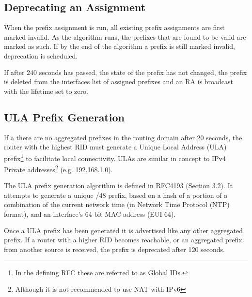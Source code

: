 \documentclass[12pt,a4paper,twoside]{report}
\begin{document}
\subsection{Deprecating an Assignment}
When the prefix assignment is run, all existing prefix assignments are first
marked invalid. As the algorithm runs, the prefixes that are found to be valid
are marked as such. If by the end of the algorithm a prefix is still marked
invalid, deprecation is scheduled. 

If after 240 seconds has passed, the state of the prefix has not changed, the
prefix is deleted from the interfaces list of assigned prefixes and an RA is
broadcast with the lifetime set to zero. 

\subsection{ULA Prefix Generation}
If a there are no aggregated prefixes in the routing domain after 20 seconds,
the router with the highest RID must generate a Unique Local Address
(ULA) prefix\footnote{In the defining
RFC these are referred to as Global IDs.} to facilitate local connectivity.
ULAs are similar in concept to IPv4 Private addresses\footnote{Although it is
not recommended to use NAT with IPv6} (e.g. 192.168.1.0). 

The ULA prefix generation algorithm is defined in RFC4193 (Section
3.2)\cite{rfc4193}. It attempts to generate a unique /48 prefix, based on a
hash of a portion of a combination of the current network time (in Network Time
Protocol (NTP)  format), and an
interface's 64-bit MAC address (EUI-64).

Once a ULA prefix has been generated it is advertised like any other aggregated
prefix. If a router with a higher RID becomes reachable, or an aggregated
prefix from another source is received, the prefix is deprecated after 120
seconds. 
\end{document}
